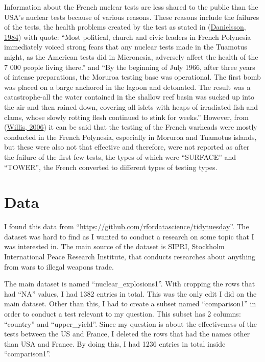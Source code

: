 \documentclass[
  12pt,
]{article}
\begin{document}
Information about the French nuclear tests are less shared to the public than the USA's nuclear tests because of various reasons. These reasons include the failures of the tests, the health problems created by the test as stated in (\protect\hyperlink{ref-danielsson:1984}{Danielsson, 1984}) with quote: ``Most political, church and civic leaders in French Polynesia immediately voiced strong fears that any nuclear tests made in the Tuamotus might, as the American tests did in Micronesia, adversely affect the health of the 7 000 people living there.'' and ``By the beginning of July 1966, after three years of intense preparations, the Moruroa testing base was operational. The first bomb was placed on a barge anchored in the lagoon and detonated. The result was a catastrophe-all the water contained in the shallow reef basin was sucked up into the air and then rained down, covering all islets with heaps of irradiated fish and clams, whose slowly rotting flesh continued to stink for weeks.'' However, from (\protect\hyperlink{ref-willis:2006}{Willis, 2006}) it can be said that the testing of the French warheads were mostly conducted in the French Polynesia, especially in Moruroa and Tuamotus islands, but these were also not that effective and therefore, were not reported as after the failure of the first few tests, the types of which were ``SURFACE'' and ``TOWER'', the French converted to different types of testing types.

\hypertarget{data}{%
\section{Data}\label{data}}

I found this data from ``\url{https://github.com/rfordatascience/tidytuesday}''. The dataset was hard to find as I wanted to conduct a research on some topic that I was interested in. The main source of the dataset is SIPRI, Stockholm International Peace Research Institute, that conducts researches about anything from wars to illegal weapons trade.

The main dataset is named ``nuclear\_explosions1''. With cropping the rows that had ``NA'' values, I had 1382 entries in total. This was the only edit I did on the main dataset. Other than this, I had to create a subset named ``comparison1'' in order to conduct a test relevant to my question. This subset has 2 columns: ``country'' and ``upper\_yield''. Since my question is about the effectiveness of the tests between the US and France, I deleted the rows that had the names other than USA and France. By doing this, I had 1236 entries in total inside ``comparison1''.
\end{document}

